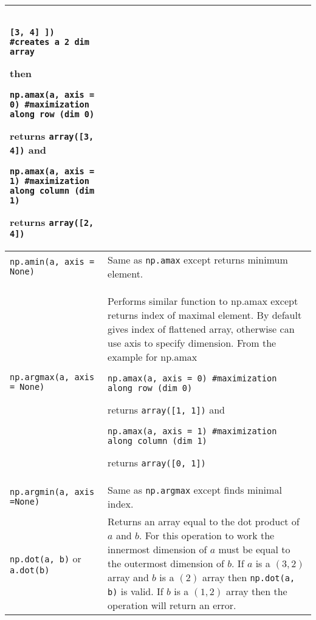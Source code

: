 \documentclass[]{article}
\begin{document}
\begin{longtable}{ | m{6cm}  | m{11cm} |}
\begin{verbatim}
                [3, 4] ]) #creates a 2 dim array
	\end{verbatim}
    then
	\begin{verbatim}
np.amax(a, axis = 0) #maximization along row (dim 0)
	\end{verbatim}
    returns {\texttt{array([3, 4])} } and 
	\begin{verbatim}
np.amax(a, axis = 1) #maximization along column (dim 1)
	\end{verbatim}
    returns {\texttt{array([2, 4])} }
	\\\hline
	\texttt{np.amin(a, axis = None)} & Same as {\texttt{np.amax} } except returns minimum element.
	\\\hline
	\texttt{np.argmax(a, axis = None)} & Performs similar function to np.amax except returns index of maximal element.  By default gives index of flattened array, otherwise can use axis to specify dimension.  From the example for np.amax
	\begin{verbatim}
np.amax(a, axis = 0) #maximization along row (dim 0)
	\end{verbatim}
    returns {\texttt{array([1, 1])} } and 
	\begin{verbatim}
np.amax(a, axis = 1) #maximization along column (dim 1)
	\end{verbatim}
    returns {\texttt{array([0, 1])} }
	\\\hline
	\texttt{np.argmin(a, axis =None)} & Same as {\texttt{np.argmax} } except finds minimal index.
	\\\hline
\texttt{np.dot(a, b)} or \texttt{a.dot(b)} & Returns an array equal to the dot product of $a$ and $b$.  For this operation to work the innermost dimension of $a$ must be equal to the outermost dimension of $b$.  If $a$ is a $(3, 2)$ array and $b$ is a $(2)$ array then \texttt{np.dot(a, b)} is valid.  If $b$ is a $(1, 2)$ array then the operation will return an error.
	\\\hline
\end{longtable}

\end{document}
